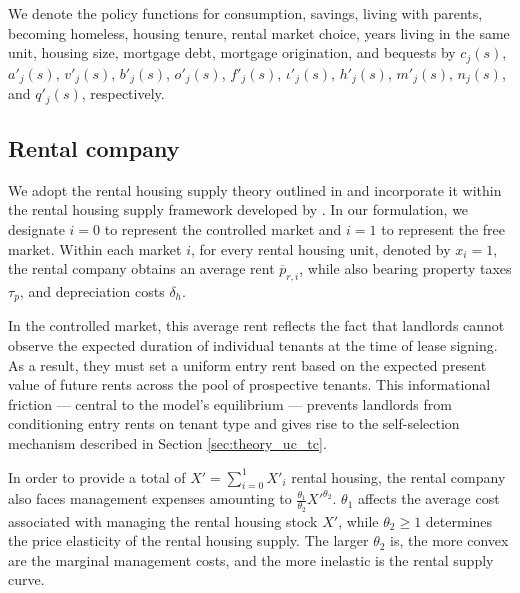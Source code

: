 \documentclass[parskip=full]{article}
\begin{document}
We denote the policy functions for consumption, savings, living with parents, becoming homeless, housing tenure, rental market choice, years living in the same unit, housing size, mortgage debt, mortgage origination, and bequests by $c_{j}(s)$, $a'_{j}(s)$, $v'_{j}(s)$, $b'_{j}(s)$, $o'_{j}(s)$, $f'_{j}(s)$, $\iota'_{j}(s)$, $h'_{j}(s)$, $m'_{j}(s)$, $n_{j}(s)$, and $q'_{j}(s)$, respectively.

\subsection{Rental company}\label{sec:rental_company}

We adopt the rental housing supply theory outlined in \citet{fallis-1985} and incorporate it within the rental housing supply framework developed by \citet{garrigaeetal-2009}. In our formulation, we designate $i=0$ to represent the controlled market and $i=1$ to represent the free market. Within each market $i$, for every rental housing unit, denoted by $x_i = 1$, the rental company obtains an average rent $\overline{p}_{r,i}$, while also bearing property taxes $\tau_{p}$, and depreciation costs $\delta_{h}$. 

In the controlled market, this average rent reflects the fact that landlords cannot observe the expected duration of individual tenants at the time of lease signing. As a result, they must set a uniform entry rent based on the expected present value of future rents across the pool of prospective tenants. This informational friction — central to the model’s equilibrium — prevents landlords from conditioning entry rents on tenant type and gives rise to the self-selection mechanism described in Section \ref{sec:theory_uc_tc}.

In order to provide a total of $X'=\sum^{1}_{i=0} X'_{i}$ rental housing, the rental company also faces management expenses amounting to $\frac{\theta_{1}}{\theta_{2}}X'^{\theta_{2}}$. $\theta_{1}$ affects the average cost associated with managing the rental housing stock $X'$, while $\theta_{2}\geq 1$ determines the price elasticity of the rental housing supply. The larger $\theta_{2}$ is, the more convex are the marginal management costs, and the more inelastic is the rental supply curve.
\end{document}
